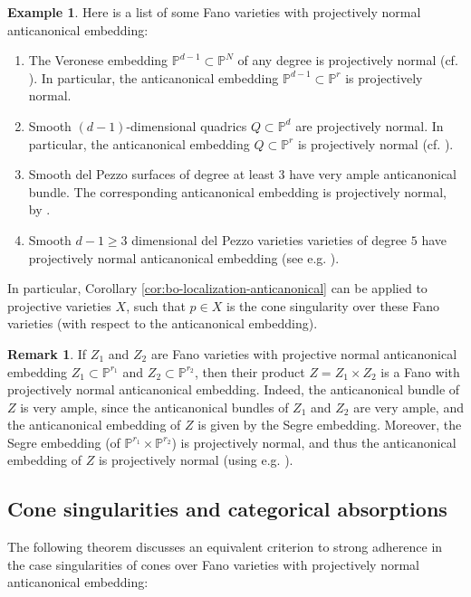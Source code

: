 \documentclass[a4paper,11pt, reqno]{amsart}
\def\P{\mathbb P}
\theoremstyle{plain}
\theoremstyle{definition}
\newtheorem{example}[dummy]{Example}
\newtheorem{remark}[dummy]{Remark}
\numberwithin{equation}{section}
\begin{document}
\begin{example}\label{ex:delpezzo-projnormal}
    Here is a list of some Fano varieties with projectively normal anticanonical embedding:
    \begin{enumerate}
        \item The Veronese embedding $\P^{d-1} \subset \P^N$ of any degree is projectively normal (cf. \cite[Chapter II, Exercise 5.14]{hartshorne}). 
        In particular, the anticanonical embedding $\P^{d-1} \subset \P^r$ is projectively normal.
        \item Smooth $(d-1)$-dimensional quadrics $Q \subset \P^{d}$ are projectively normal.
        In particular, the anticanonical embedding $Q\subset \P^r$ is projectively normal (cf. \cite[Chapter II, Exercise 5.14]{hartshorne}).
        \item Smooth del Pezzo surfaces of degree at least $3$ have very ample anticanonical bundle.
        The corresponding anticanonical embedding is projectively normal, by \cite[Theorem 8.3.4]{dolgachev}.
        \item Smooth $d-1 \geq 3$ dimensional del Pezzo varieties varieties of degree $5$ have projectively normal anticanonical embedding (see e.g. \cite[Corollary 2.8 and Definition 0.1]{Gallego-Purnaprajna}).
    \end{enumerate}
    In particular, Corollary \ref{cor:bo-localization-anticanonical} can be applied to projective varieties $X$, such that $p\in X$ is the cone singularity over these Fano varieties (with respect to  the anticanonical embedding).
\end{example}

\begin{remark}\label{rmk:projnormal-product}
    If $Z_1 $ and $Z_2$ are Fano varieties with projective normal anticanonical embedding $Z_1 \subset \P^{r_1}$ and $Z_2 \subset \P^{r_2}$, then their product $Z = Z_1  \times Z_2$ is a Fano with projectively normal anticanonical embedding.
    Indeed, the anticanonical bundle of $Z$ is very ample, since the  anticanonical bundles of $Z_1$ and $Z_2$ are very ample, and the anticanonical embedding of $Z$ is given by the Segre embedding.
    Moreover, the Segre embedding (of $\P^{r_1} \times \P^{r_2}$) is projectively normal, and thus the anticanonical embedding of $Z$ is projectively normal (using e.g. \cite[Chapter II, Exercise 5.14 (d)]{hartshorne}).
\end{remark}


\subsection{Cone singularities and categorical absorptions}
The following theorem discusses an equivalent criterion to strong adherence in the case  singularities of cones over Fano varieties with projectively normal anticanonical embedding:
\end{document}
